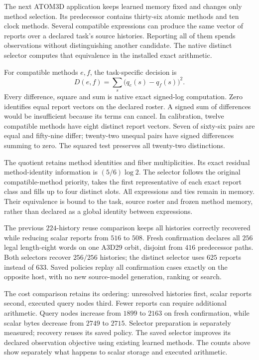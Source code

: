 The next ATOM3D application keeps learned memory fixed and changes only method selection. Its predecessor contains thirty-six atomic methods and ten clock methods. Several compatible expressions can produce the same vector of reports over a declared task's source histories. Reporting all of them spends observations without distinguishing another candidate. The native distinct selector computes that equivalence in the installed exact arithmetic. 

For compatible methods $e,f$, the task-specific decision is
\[
 D(e,f)=\sum_s\big(q_e(s)-q_f(s)\big)^2.
\]
Every difference, square and sum is native exact signed-log computation. Zero identifies equal report vectors on the declared roster. A signed sum of differences would be insufficient because its terms can cancel. In calibration, twelve compatible methods have eight distinct report vectors. Seven of sixty-six pairs are equal and fifty-nine differ; twenty-two unequal pairs have signed differences summing to zero. The squared test preserves all twenty-two distinctions.

The quotient retains method identities and fiber multiplicities. Its exact residual method-identity information is $(5/6)\log2$. The selector follows the original compatible-method priority, takes the first representative of each exact report class and fills up to four distinct slots. All expressions and ties remain in memory. Their equivalence is bound to the task, source roster and frozen method memory, rather than declared as a global identity between expressions.

The previous $224$-history reuse comparison keeps all histories correctly recovered while reducing scalar reports from $516$ to $508$. Fresh confirmation declares all $256$ legal length-eight words on one A3D29 orbit, disjoint from $416$ predecessor paths. Both selectors recover $256/256$ histories; the distinct selector uses $625$ reports instead of $633$. Saved policies replay all confirmation cases exactly on the opposite host, with no new source-model generation, ranking or search.

The cost comparison retains its ordering: unresolved histories first, scalar reports second, executed query nodes third. Fewer reports can require additional arithmetic. Query nodes increase from $1899$ to $2163$ on fresh confirmation, while scalar bytes decrease from $2749$ to $2715$. Selector preparation is separately measured; recovery reuses its saved policy. The saved selector improves its declared observation objective using existing learned methods. The counts above show separately what happens to scalar storage and executed arithmetic.

